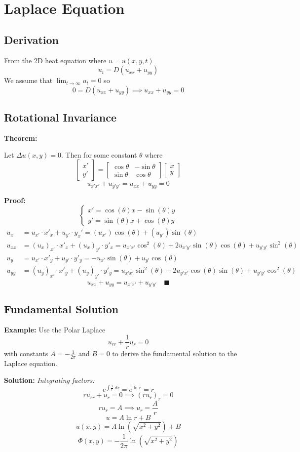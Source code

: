 \documentclass[12pt]{article}
\newcommand{\qed}{\quad \blacksquare}
\begin{document}
\section{Laplace Equation}
\subsection{Derivation}
From the 2D heat equation where $u = u(x, y, t)$
\[u_t = D(u_{xx} + u_{yy})\]
We assume that $\lim_{t\to \infty} u_t = 0$ so 
\[0 = D(u_{xx} + u_{yy}) \implies u_{xx} + u_{yy} = 0\]
\subsection{Rotational Invariance}
\textbf{Theorem:} 

Let $\Delta u(x, y) = 0$. Then for some constant $\theta$ where 
\[\begin{bmatrix}
    x'\\y'
\end{bmatrix} = \begin{bmatrix}
    \cos \theta & -\sin \theta\\
    \sin \theta & \cos \theta
\end{bmatrix} \begin{bmatrix}
    x\\y
\end{bmatrix}\]
\[u_{x' x'} + u_{y' y'} = u_{xx} + u_{yy} = 0\]

\textbf{Proof:}
\[\begin{cases}
    x' = \cos(\theta) x - \sin(\theta)y\\
    y' = \sin(\theta)x + \cos(\theta)y
\end{cases}\]
\begin{align*}
    u_x &= u_{x'} \cdot x'_x + u_{y'} \cdot y_x' = (u_{x'})\cos(\theta) + (u_{y'})\sin(\theta)\\
    u_{xx} &= (u_x)_{x'} \cdot x'_x + (u_x)_{y'} \cdot y'_x = u_{x'x'}\cos^2(\theta) + 2u_{x'y'}\sin(\theta)\cos(\theta) + u_{y'y'} \sin^2(\theta)\\
    u_y &= u_{x'} \cdot x'_y + u_{y'} \cdot y'_y = -u_{x'}\sin(\theta) + u_{y'}\cos(\theta)\\
    u_{yy} &= (u_y)_{x'} \cdot x'_y + (u_y)_{y'} \cdot y'_y = u_{x'x'}\sin^2(\theta) - 2u_{y'x'}\cos(\theta)\sin(\theta) + u_{y'y'}\cos^2(\theta)
\end{align*}
\[u_{xx} + u_{yy}= u_{x'x'} + u_{y'y'} \qed\]

\subsection{Fundamental Solution}
\textbf{Example:}
Use the Polar Laplace 
\[u_{rr} + \frac{1}{r}u_r =0\]
with constants $A = -\frac{1}{2\pi}$ and $B =0$ to derive the fundamental solution to the Laplace equation. 

\textbf{Solution:}
\emph{Integrating factors:}
\[e^{\int \frac{1}{r}\; dr} = e^{\ln r} = r\]
\[ru_{rr} + u_r = 0 \implies (ru_r)_r = 0\]
\[ru_{r} = A \implies u_r = \frac{A}{r}\]
\[u = A \ln r + B\]
\[u(x, y) = A\ln(\sqrt{x^2 + y^2}) + B\]
\[\boxed{\Phi(x, y) = -\frac{1}{2\pi}\ln(\sqrt{x^2 + y^2})}\]
\end{document}
